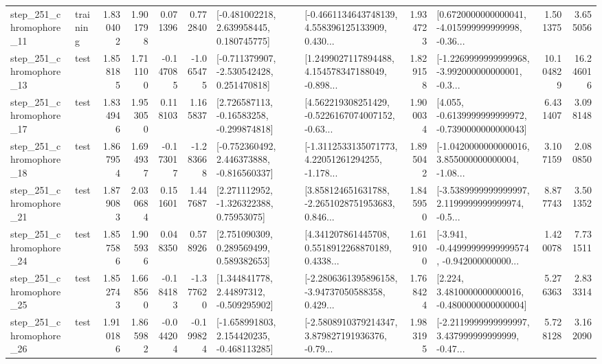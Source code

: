 \begin{tabular}{llrrrrllrlrr}
  step\_251\_chromophore\_11 &  training &      1.830402 &    1.901798 &      0.071396 &  0.772840 &    [-0.481002218, 2.639958445, 0.180745775] &  [-0.4661134643748139, 4.558396125133909, 0.430... &       1.934723 &  [0.6720000000000041, -4.015999999999998, -0.36... &            1.501375 &          3.655056 \\
  step\_251\_chromophore\_13 &      test &      1.858185 &    1.711100 &     -0.147085 & -1.065475 &   [-0.711379907, -2.530542428, 0.251470818] &  [1.2499027117894488, 4.154578347188049, -0.898... &       1.829158 &  [-1.2269999999999968, -3.992000000000001, -0.3... &           10.104829 &         16.246016 \\
  step\_251\_chromophore\_17 &      test &      1.834946 &    1.953050 &      0.118103 &  1.165837 &    [2.726587113, -0.16583258, -0.299874818] &  [4.562219308251429, -0.5226167074007152, -0.63... &       1.900034 &  [4.055, -0.6139999999999972, -0.7390000000000043] &            6.431407 &          3.098148 \\
  step\_251\_chromophore\_18 &      test &      1.867954 &    1.694937 &     -0.173017 & -1.283668 &   [-0.752360492, 2.446373888, -0.816560337] &  [-1.3112533135071773, 4.22051261294255, -1.178... &       1.895042 &  [-1.0420000000000016, 3.855000000000004, -1.08... &            3.107159 &          2.080850 \\
  step\_251\_chromophore\_21 &      test &      1.879083 &    2.030684 &      0.151601 &  1.447687 &     [2.271112952, -1.326322388, 0.75953075] &  [3.858124651631788, -2.2651028751953683, 0.846... &       1.845950 &  [-3.5389999999999997, 2.1199999999999974, -0.5... &            8.877743 &          3.501352 \\
  step\_251\_chromophore\_24 &      test &      1.857586 &    1.905936 &      0.048350 &  0.578926 &     [2.751090309, 0.289569499, 0.589382653] &  [4.341207861445708, 0.5518912268870189, 0.4338... &       1.619100 &  [-3.941, -0.44999999999999574, -0.942000000000... &            1.420078 &          7.731511 \\
  step\_251\_chromophore\_25 &      test &      1.852743 &    1.668560 &     -0.184183 & -1.377620 &     [1.344841778, 2.44897312, -0.509295902] &  [-2.2806361395896158, -3.94737050588358, 0.429... &       1.768424 &   [2.224, 3.4810000000000016, -0.4800000000000004] &            5.276363 &          2.833314 \\
  step\_251\_chromophore\_26 &      test &      1.910186 &    1.865982 &     -0.044204 & -0.199824 &   [-1.658991803, 2.154420235, -0.468113285] &  [-2.5808910379214347, 3.879827191936376, -0.79... &       1.983195 &  [-2.2119999999999997, 3.437999999999999, -0.47... &            5.728128 &          3.162090 \\

\end{tabular}
